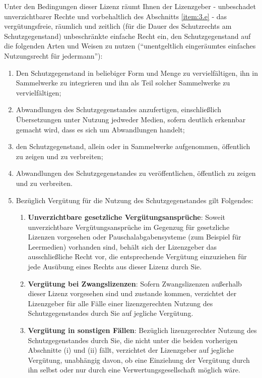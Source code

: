 \begin{enumerate}
Unter den Bedingungen dieser Lizenz räumt Ihnen der Lizenzgeber - unbeschadet unverzichtbarer Rechte und vorbehaltlich des Abschnitts \ref{item:3.e} - das vergütungsfreie, räumlich und zeitlich (für die Dauer des Schutzrechts am Schutzgegenstand) unbeschränkte einfache Recht ein, den Schutzgegenstand auf die folgenden Arten und Weisen zu nutzen (``unentgeltlich eingeräumtes einfaches Nutzungsrecht für jedermann''):
    \begin{enumerate}
      \item Den Schutzgegenstand in beliebiger Form und Menge zu vervielfältigen, ihn in Sammelwerke zu integrieren und ihn als Teil solcher Sammelwerke zu vervielfältigen;
      \item \label{item:3.b} Abwandlungen des Schutzgegenstandes anzufertigen, einschließlich Übersetzungen unter Nutzung jedweder Medien, sofern deutlich erkennbar gemacht wird, dass es sich um Abwandlungen handelt;
      \item den Schutzgegenstand, allein oder in Sammelwerke aufgenommen, öffentlich zu zeigen und zu verbreiten;
      \item Abwandlungen des Schutzgegenstandes zu veröffentlichen, öffentlich zu zeigen und zu verbreiten.
      \item \label{item:3.e} Bezüglich Vergütung für die Nutzung des Schutzgegenstandes gilt Folgendes:
        \begin{enumerate}
          \item \textbf{Unverzichtbare gesetzliche Vergütungsansprüche}: Soweit unverzichtbare Vergütungsansprüche im Gegenzug für gesetzliche Lizenzen vorgesehen oder Pauschalabgabensysteme (zum Beispiel für Leermedien) vorhanden sind, behält sich der Lizenzgeber das ausschließliche Recht vor, die entsprechende Vergütung einzuziehen für jede Ausübung eines Rechts aus dieser Lizenz durch Sie.
          \item \textbf{Vergütung bei Zwangslizenzen}: Sofern Zwangslizenzen außerhalb dieser Lizenz vorgesehen sind und zustande kommen, verzichtet der Lizenzgeber für alle Fälle einer lizenzgerechten Nutzung des Schutzgegenstandes durch Sie auf jegliche Vergütung.
          \item \textbf{Vergütung in sonstigen Fällen}: Bezüglich lizenzgerechter Nutzung des Schutzgegenstandes durch Sie, die nicht unter die beiden vorherigen Abschnitte (i) und (ii) fällt, verzichtet der Lizenzgeber auf jegliche Vergütung, unabhängig davon, ob eine Einziehung der Vergütung durch ihn selbst oder nur durch eine Verwertungsgesellschaft möglich wäre.

\end{enumerate}
\end{enumerate}
\end{enumerate}
